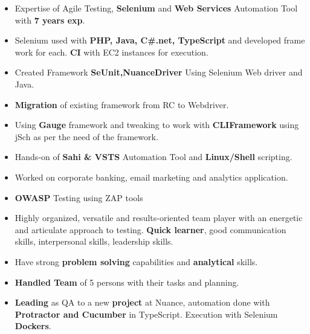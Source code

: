 

\begin{cvparagraph}

\begin{itemize}
 \item {Expertise of Agile Testing, \textbf{Selenium} and \textbf{Web Services} Automation Tool with \textbf{7 years exp}.}

 \item {Selenium used with \textbf{PHP, Java, C\#.net, TypeScript} and developed frame work for each. \textbf{CI} with EC2 instances for execution.}

 \item {Created Framework \textbf{SeUnit,NuanceDriver} Using Selenium Web driver and Java.}

 \item {\textbf{Migration} of existing framework from RC to Webdriver.}

 \item {Using \textbf{Gauge} framework and tweaking to work with \textbf{CLIFramework} using jSch as per the need of the framework.}

 \item {Hands-on of \textbf{Sahi \& VSTS} Automation Tool and \textbf{Linux/Shell} scripting.}

 \item {Worked on corporate banking, email marketing and analytics application.}

 \item {\textbf{OWASP} Testing using ZAP tools}

 \item {Highly organized, versatile and results-oriented team player with an energetic and articulate approach to testing. \textbf{Quick learner}, good communication skills, interpersonal skills, leadership skills.}

 \item {Have strong \textbf{problem solving} capabilities and \textbf{analytical} skills.}

 \item {\textbf{Handled Team} of 5 persons with their tasks and planning.}
 
 \item {\textbf{Leading} as QA to a new \textbf{project} at Nuance, automation done with \textbf{Protractor and Cucumber} in TypeScript. Execution with Selenium \textbf{Dockers}.}
\end{itemize}
\end{cvparagraph}
